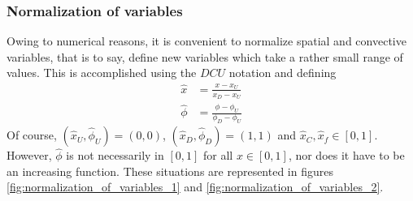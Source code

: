 \subsubsection{Normalization of variables}

Owing to numerical reasons, it is convenient to normalize spatial and convective
variables, that is to say, define new variables which take a rather small range
of values. This is accomplished using the $DCU$ notation and defining
\begin{align}
	\hat{x} &= \frac{x - x_U}{x_D - x_U} \\
	\hat{\phi} &= \frac{\phi - \phi_U}{\phi_D - \phi_U}
\end{align}
Of course, $(\hat{x}_U, \hat{\phi}_U) = (0,0)$, $(\hat{x}_D, \hat{\phi}_D) =
(1,1)$ and $\hat{x}_C, \hat{x}_f \in [0,1]$. However, $\hat{\phi}$ is not
necessarily in $[0,1]$ for all $x \in [0,1]$, nor does it have to be an
increasing function. These situations are represented in figures
\ref{fig:normalization_of_variables_1} and
\ref{fig:normalization_of_variables_2}.

